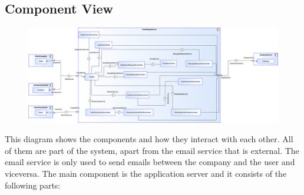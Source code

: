 \documentclass{article}
\begin{document}
\subsection{Component View}
\begin{figure}[h!]
\centering
    \textbf{}\par\medskip
	\includegraphics[width= \linewidth]{comp.png}
\end{figure}
This diagram shows the components and how they interact with each other. All of them are part of the system, apart from the email service that is external. The email service is only used to send emails between the company and the user and viceversa. \newline
The main component is the application server and it consists of the following parts:
\end{document}
